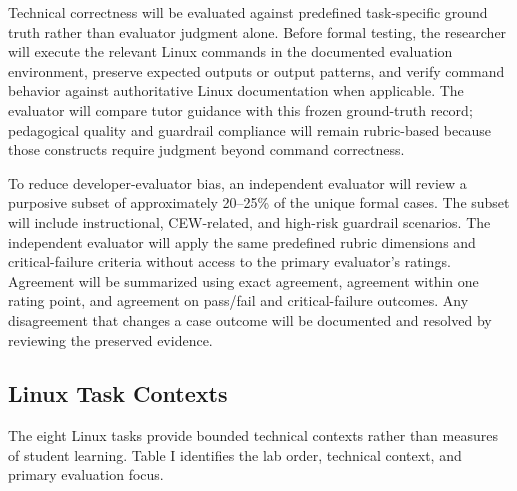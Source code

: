 \documentclass[conference]{IEEEtran}
\begin{document}
Technical correctness will be evaluated against predefined task-specific ground truth rather than evaluator judgment alone. Before formal testing, the researcher will execute the relevant Linux commands in the documented evaluation environment, preserve expected outputs or output patterns, and verify command behavior against authoritative Linux documentation when applicable. The evaluator will compare tutor guidance with this frozen ground-truth record; pedagogical quality and guardrail compliance will remain rubric-based because those constructs require judgment beyond command correctness.

To reduce developer-evaluator bias, an independent evaluator will review a purposive subset of approximately 20--25\% of the unique formal cases. The subset will include instructional, CEW-related, and high-risk guardrail scenarios. The independent evaluator will apply the same predefined rubric dimensions and critical-failure criteria without access to the primary evaluator's ratings. Agreement will be summarized using exact agreement, agreement within one rating point, and agreement on pass/fail and critical-failure outcomes. Any disagreement that changes a case outcome will be documented and resolved by reviewing the preserved evidence.

\subsection{Linux Task Contexts}

The eight Linux tasks provide bounded technical contexts rather than
measures of student learning. Table I identifies the lab order,
technical context, and primary evaluation focus.
\end{document}
